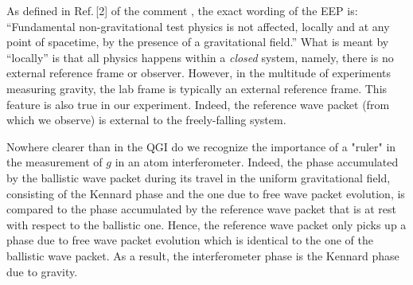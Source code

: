 \documentclass[aps,prx,onecolumn,superscriptaddress,longbibliography]{revtex4-2}
\begin{document}
As defined in Ref.\,[2] of the comment \cite{QGI-comment}, the exact wording of the EEP is: ``Fundamental non-gravitational test physics is not affected, locally and at any point of spacetime, by the presence of a gravitational field.”
What is meant by ``locally” is that all physics happens within a {\it closed} system, namely, there is no external reference frame or observer. However, in the multitude of experiments measuring gravity, the lab frame is typically an external reference frame. This feature is also true in our experiment. Indeed, the reference wave packet (from which we observe) is external to the freely-falling system.

Nowhere clearer than in the QGI do we recognize the importance of a "ruler" in the measurement of $g$ in an atom interferometer. Indeed, the phase accumulated by the ballistic wave packet during its travel in the uniform gravitational field, consisting of the Kennard phase and the one due to free wave packet evolution, is compared to the phase accumulated by the reference wave packet that is at rest with respect to the ballistic one. Hence, the reference wave packet only picks up a phase due to free wave packet evolution which is identical to the one of the ballistic wave packet. As a result, the interferometer phase is the Kennard phase due to gravity.

\end{document}
